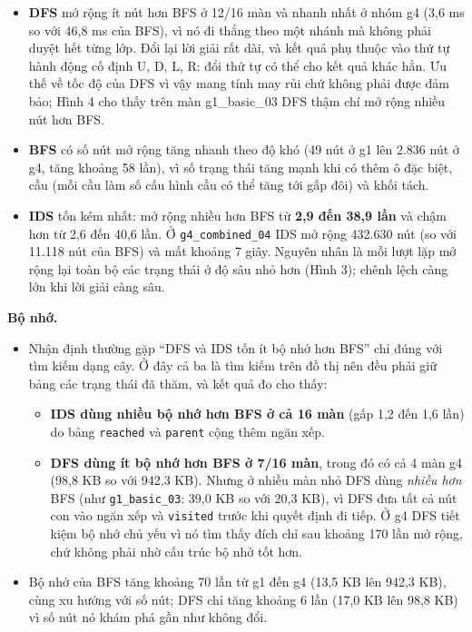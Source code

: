 \begin{itemize}
\item \textbf{DFS} mở rộng ít nút hơn BFS ở 12/16 màn và nhanh nhất ở nhóm g4 (3,6 ms so với 46,8 ms của BFS), vì nó đi thẳng theo một nhánh mà không phải duyệt hết từng lớp. Đổi lại lời giải rất dài, và kết quả phụ thuộc vào thứ tự hành động cố định U, D, L, R: đổi thứ tự có thể cho kết quả khác hẳn. Ưu thế về tốc độ của DFS vì vậy mang tính may rủi chứ không phải được đảm bảo; Hình 4 cho thấy trên màn g1\_basic\_03 DFS thậm chí mở rộng nhiều nút hơn BFS.
\item \textbf{BFS} có số nút mở rộng tăng nhanh theo độ khó (49 nút ở g1 lên 2.836 nút ở g4, tăng khoảng 58 lần), vì số trạng thái tăng mạnh khi có thêm ô đặc biệt, cầu (mỗi cầu làm số cấu hình cầu có thể tăng tới gấp đôi) và khối tách.
\item \textbf{IDS} tốn kém nhất: mở rộng nhiều hơn BFS từ \textbf{2,9 đến 38,9 lần} và chậm hơn từ 2,6 đến 40,6 lần. Ở \texttt{g4\_\allowbreak{}combined\_\allowbreak{}04} IDS mở rộng 432.630 nút (so với 11.118 nút của BFS) và mất khoảng 7 giây. Nguyên nhân là mỗi lượt lặp mở rộng lại toàn bộ các trạng thái ở độ sâu nhỏ hơn (Hình 3); chênh lệch càng lớn khi lời giải càng sâu.
\end{itemize}

\textbf{Bộ nhớ.}

\begin{itemize}
\item Nhận định thường gặp ``DFS và IDS tốn ít bộ nhớ hơn BFS'' chỉ đúng với tìm kiếm dạng cây. Ở đây cả ba là tìm kiếm trên đồ thị nên đều phải giữ bảng các trạng thái đã thăm, và kết quả đo cho thấy:
\begin{itemize}
\item \textbf{IDS dùng nhiều bộ nhớ hơn BFS ở cả 16 màn} (gấp 1,2 đến 1,6 lần) do bảng \texttt{reached} và \texttt{parent} cộng thêm ngăn xếp.
\item \textbf{DFS dùng ít bộ nhớ hơn BFS ở 7/16 màn}, trong đó có cả 4 màn g4 (98,8 KB so với 942,3 KB). Nhưng ở nhiều màn nhỏ DFS dùng \emph{nhiều hơn} BFS (như \texttt{g1\_\allowbreak{}basic\_\allowbreak{}03}: 39,0 KB so với 20,3 KB), vì DFS đưa tất cả nút con vào ngăn xếp và \texttt{visited} trước khi quyết định đi tiếp. Ở g4 DFS tiết kiệm bộ nhớ chủ yếu vì nó tìm thấy đích chỉ sau khoảng 170 lần mở rộng, chứ không phải nhờ cấu trúc bộ nhớ tốt hơn.
\end{itemize}
\item Bộ nhớ của BFS tăng khoảng 70 lần từ g1 đến g4 (13,5 KB lên 942,3 KB), cùng xu hướng với số nút; DFS chỉ tăng khoảng 6 lần (17,0 KB lên 98,8 KB) vì số nút nó khám phá gần như không đổi.
\end{itemize}

